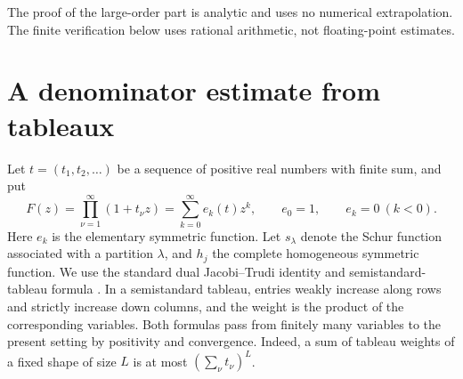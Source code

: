 \documentclass[11pt]{article}
\theoremstyle{remark}\newtheorem{remark}[theorem]{Remark}
\begin{document}
The proof of the large-order part is analytic and uses no numerical extrapolation. The finite verification below uses rational arithmetic, not floating-point estimates.

\section{A denominator estimate from tableaux}
Let $t=(t_1,t_2,\ldots)$ be a sequence of positive real numbers with finite sum, and put
\[
F(z)=\prod_{\nu=1}^{\infty}(1+t_\nu z)=\sum_{k=0}^{\infty}e_k(t)z^k,
\qquad e_0=1,\qquad e_k=0\ (k<0).
\]
Here $e_k$ is the elementary symmetric function. Let $s_\lambda$ denote the Schur function associated with a partition $\lambda$, and $h_j$ the complete homogeneous symmetric function. We use the standard dual Jacobi--Trudi identity and semistandard-tableau formula \cite{Macdonald}. In a semistandard tableau, entries weakly increase along rows and strictly increase down columns, and the weight is the product of the corresponding variables. Both formulas pass from finitely many variables to the present setting by positivity and convergence. Indeed, a sum of tableau weights of a fixed shape of size $L$ is at most $(\sum_\nu t_\nu)^L$.
\end{document}
